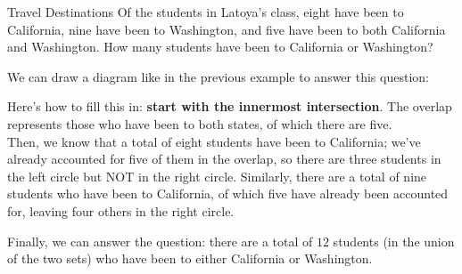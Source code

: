 \begin{example}{Travel Destinations}
Of the students in Latoya's class, eight have been to California, nine have been to Washington, and five have been to both California and Washington.  How many students have been to California or Washington?

\sol
We can draw a diagram like in the previous example to answer this question:

\begin{center}
\end{center}

Here's how to fill this in: \textbf{start with the innermost intersection}.  The overlap represents those who have been to both states, of which there are five.\\

Then, we know that a total of eight students have been to California; we've already accounted for five of them in the overlap, so there are three students in the left circle but NOT in the right circle.  Similarly, there are a total of nine students who have been to California, of which five have already been accounted for, leaving four others in the right circle.

\begin{center}
\end{center}

Finally, we can answer the question: there are a total of $\boxed{12}$ students (in the union of the two sets) who have been to either California or Washington.

\end{example}

